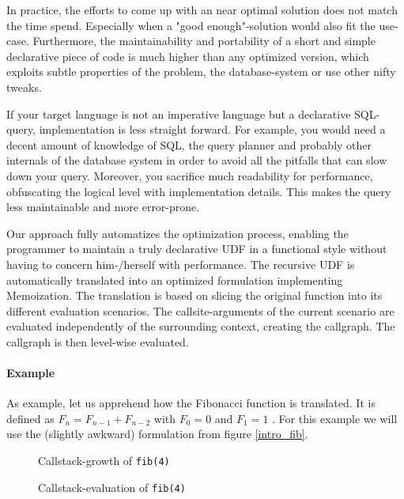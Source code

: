 In practice, the efforts to come up with an near optimal solution does not match the time spend. Especially when a "good enough"-solution would also fit the use-case. Furthermore, the maintainability and portability of a short and simple declarative piece of code is much higher than any optimized version, which exploits subtle properties of the problem, the database-system or use other nifty tweaks.

If your target language is not an imperative language but a declarative SQL-query, implementation is less straight forward. For example, you would need a decent amount of knowledge of SQL, the query planner and probably other internals of the database system in order to avoid all the pitfalls that can slow down your query. Moreover, you sacrifice much readability for performance, obfuscating the logical level with implementation details. This makes the query less maintainable and more error-prone.

Our approach fully automatizes the optimization process, enabling the programmer to maintain a truly declarative UDF in a functional style without having to concern him-/herself with performance. The recursive UDF is automatically translated into an optimized formulation implementing Memoization. The translation is based on slicing the original function into its different evaluation scenarios. The callsite-arguments of the current scenario are evaluated independently of the surrounding context, creating the callgraph. The callgraph is then level-wise evaluated.

\paragraph*{Example}

As example, let us apprehend how the Fibonacci function is translated. It is defined as $F_n = F_{n-1} + F_{n-2}$ with $F_0 = 0$ and $F_1 = 1$ \cite[p. 79]{TAOCP_Knuth}. For this example we will use the (slightly awkward) formulation from figure \autoref{intro_fib}.

\begin{figure}[h]\small
    \begin{minipage}[b]{.47\linewidth}
        
        \caption{Callstack-growth of \texttt{fib(4)}}
        \label{fib_4_callstack}
    \end{minipage}\hfill
    \begin{minipage}[b]{.5\linewidth}
    
        \caption{Callstack-evaluation of \texttt{fib(4)}}
        \label{fib_4_callstack_evaluation}
    \end{minipage}
\end{figure}

